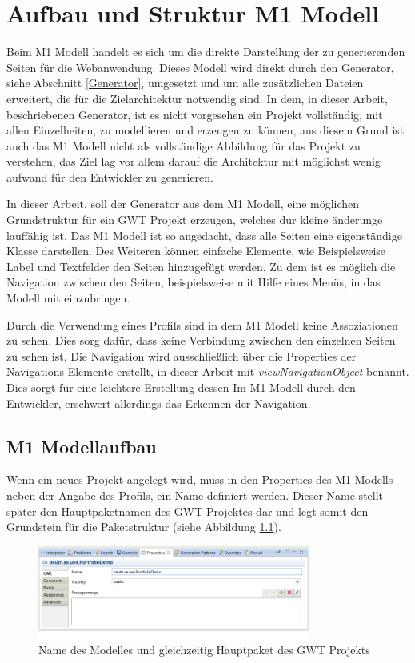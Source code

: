 \chapter{Aufbau und Struktur M1 Modell} \label{M1Modell}
Beim M1 Modell handelt es sich um die direkte Darstellung der zu generierenden
Seiten für die Webanwendung. Dieses Modell wird direkt durch den Generator,
siehe Abschnitt \ref{Generator}, umgesetzt und um alle zusätzlichen Dateien
erweitert, die für die Zielarchitektur notwendig sind. In dem, in dieser Arbeit,
beschriebenen Generator, ist es nicht vorgesehen ein Projekt vollständig, mit
allen Einzelheiten, zu modellieren und erzeugen zu können, aus diesem Grund ist
auch das M1 Modell nicht als vollständige Abbildung für das Projekt zu
verstehen, das Ziel lag vor allem darauf die Architektur mit möglichst wenig
aufwand für den Entwickler zu generieren.

In dieser Arbeit, soll der Generator aus dem M1 Modell, eine möglichen
Grundstruktur für ein GWT Projekt erzeugen, welches dur kleine änderunge
lauffähig ist. Das M1 Modell ist so angedacht, dass alle Seiten eine
eigenständige Klasse darstellen. Des Weiteren können einfache Elemente, wie
Beispielsweise Label und Textfelder den Seiten hinzugefügt werden.
Zu dem ist es möglich die Navigation zwischen den Seiten, beispielsweise mit
Hilfe eines Menüs, in das Modell mit einzubringen. 

Durch die Verwendung eines Profils sind in dem M1 Modell keine Assoziationen
zu sehen. Dies sorg dafür, dass keine Verbindung zwischen den einzelnen Seiten
zu sehen ist. Die Navigation wird ausschließlich über die Properties der
Navigations Elemente erstellt, in dieser Arbeit mit
\textit{viewNavigationObject} benannt. Dies sorgt für eine leichtere Erstellung
dessen Im M1 Modell durch den Entwickler, erschwert allerdings das Erkennen
der Navigation.

\section{M1 Modellaufbau}
Wenn ein neues Projekt angelegt wird, muss in den Properties des M1 Modells
neben der Angabe des Profils, ein Name definiert werden. Dieser Name stellt
später den Hauptpaketnamen des GWT Projektes dar und legt somit den Grundstein
für die Paketstruktur (siehe Abbildung \ref{Fig:mainpackage}).

\begin{figure}[htbp]
\begin{center}
\includegraphics[width=0.8\textwidth]{./img/ProjectPackage.png}
\caption{Name des Modelles und gleichzeitig Hauptpaket des
GWT Projekts}\label{Fig:mainpackage}
\end{center}
\end{figure}

